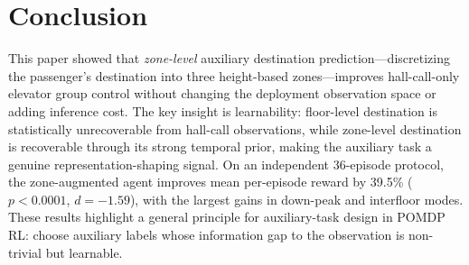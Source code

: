 \documentclass{ieeeaccess}
\begin{document}
\section{Conclusion}
\label{sec:conclusion}

This paper showed that \emph{zone-level} auxiliary destination
prediction---discretizing the passenger's destination into three
height-based zones---improves hall-call-only elevator group control
without changing the deployment observation space or adding inference
cost. The key insight is learnability: floor-level destination is
statistically unrecoverable from hall-call observations, while
zone-level destination is recoverable through its strong temporal
prior, making the auxiliary task a genuine representation-shaping
signal. On an independent 36-episode protocol, the zone-augmented
agent improves mean per-episode reward by 39.5\%
($p < 0.0001$, $d = -1.59$), with the largest gains in
down-peak and interfloor modes. These results highlight a general
principle for auxiliary-task design in POMDP RL: choose auxiliary
labels whose information gap to the observation is non-trivial but
learnable.
\end{document}
